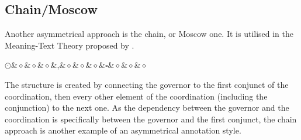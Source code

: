 \subsection{Chain/Moscow}
Another asymmetrical approach is the chain, or Moscow one. It is utilised in the Meaning-Text Theory proposed by \cite{melcuk-1988}. 

\begin{Center}
\begin{dependency}[theme = simple]
            \begin{deptext}
    $\odot$\&$\diamond$\&$\diamond$\&$\diamond$\&,\&$\diamond$\&$\diamond$\&$\diamond$\&$\square$\&$\diamond$\&$\diamond$\&$\diamond$\\
            \end{deptext}
        \end{dependency}
\end{Center}

The structure is created by connecting the governor to the first conjunct of the coordination, then every other element of the coordination (including the conjunction) to the next one. As the dependency between the governor and the coordination is specifically between the governor and the first conjunct, the chain approach is another example of an asymmetrical annotation style. 

